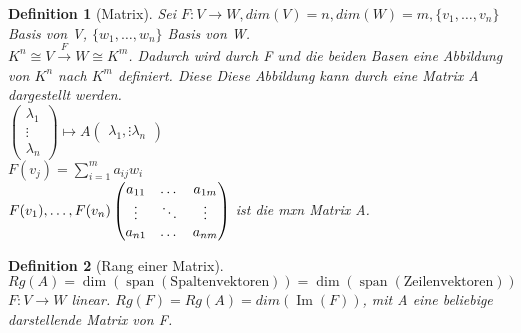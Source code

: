\documentclass{report}
\newcommand{\lb}{\lambda}
\newcommand{\ve}[1]{{\begin{pmatrix}#1 \end{pmatrix}}}
\renewcommand{\v}{\ve}
\DeclareMathOperator{\Span}{span}
\DeclareMathOperator{\Ima}{Im}
\theoremstyle{customrem}
\theoremstyle{customdef}
\newtheorem{definition}{Definition}[chapter]
\theoremstyle{customenv}
\begin{document}
\begin{definition}[Matrix]
  Sei \(F : V \to W, dim(V) = n, dim(W) = m, \{v_1, \dots, v_n\}\) Basis von V,
  \(\{w_1, \dots, w_n\}\) Basis von W.\\
  \(K^n \cong V \overset{F}{\to} W \cong K^m\). Dadurch wird durch F und die
  beiden Basen eine Abbildung von \(K^n\) nach \(K^m\) definiert. Diese
  Diese Abbildung kann durch eine Matrix A dargestellt werden.\\
  \(\v{\lb_1\\ \vdots \\ \lb_n} \mapsto A \v{\lb_1, \vdots \lb_n}\)\\
  \(F(v_j) = \sum_{i=1}^m a_{ij}w_i\)\\
  \(
  F(v_1), \dots, F(v_n)\\
  \begin{pmatrix}
    a_{11} & \dots  & a_{1m}\\
    \vdots & \ddots & \vdots\\
    a_{n1} & \dots  & a_{nm}
  \end{pmatrix}
  \)
  ist die mxn Matrix A.
\end{definition}

\begin{definition}[Rang einer Matrix]
  \(Rg(A) = \dim(\Span(\text{Spaltenvektoren}))
  = \dim(\Span(\text{Zeilenvektoren}))\)\\
  \(F : V \to W\) linear. \(Rg(F) = Rg(A) = dim(\Ima(F))\), mit A eine beliebige
  darstellende Matrix von F.
\end{definition}
\end{document}
